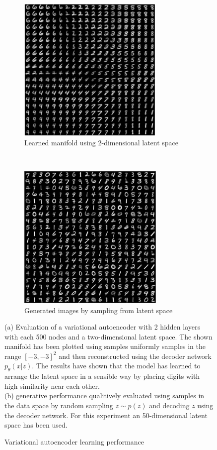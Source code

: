 \begin{figure}[t!]
    \centering
    \begin{subfigure}[t]{0.5\textwidth}
        \centering
        \includegraphics[height=7cm]{media/vae_manifold.pdf}
        \caption{Learned manifold using 2-dimensional latent space}
    \end{subfigure}%
    ~
    \begin{subfigure}[t]{0.5\textwidth}
        \centering
        \includegraphics[height=7cm]{media/vae_samples.pdf}
        \caption{Generated images by sampling from latent space}
    \end{subfigure}
    \caption{Variational autoencoder learning performance}
    \label{fig:vae_experiments}
    \medskip
    \small
    (a) Evaluation of a variational autoencoder with 2 hidden layers with each 500 nodes and a two-dimensional latent space.
    The shown manifold has been plotted using samples uniformly samples in the range $[-3,-3]^2$ and then reconstructed using the decoder network $p_\theta(x|z)$. The results have shown that the model has learned to arrange the latent space in a sensible way by placing digits with high similarity near each other.\\
    (b) generative performance qualitively evaluated using samples in the data space by random sampling $z \sim p(z)$ and decoding $z$ using the decoder network. For this experiment an 50-dimensional latent space has been used.
\end{figure}


